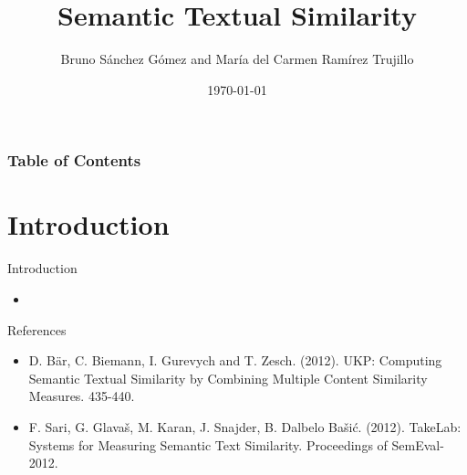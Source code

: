 \documentclass{beamer}
\title{Semantic Textual Similarity}
\author{Bruno Sánchez Gómez and María del Carmen Ramírez Trujillo}
\date{\today}
\begin{document}
\begin{frame}
    \titlepage
\end{frame}

\begin{frame}
    \frametitle{Table of Contents}
    \tableofcontents
\end{frame}

\section{Introduction}
\frame{\tableofcontents[currentsection]}
\begin{frame}{Introduction}
    \begin{itemize}
        \item 
    \end{itemize}
\end{frame}



\begin{frame}{References}
    \begin{itemize}
        \item D. Bär, C. Biemann, I. Gurevych and T. Zesch. (2012). UKP: Computing Semantic Textual Similarity by Combining Multiple Content Similarity Measures. 435-440. 
        \item F. Sari, G. Glavaš, M. Karan, J. Snajder, B. Dalbelo Bašić. (2012). TakeLab: Systems for Measuring Semantic Text Similarity. Proceedings of SemEval-2012. 
    \end{itemize}    
\end{frame}
\end{document}
